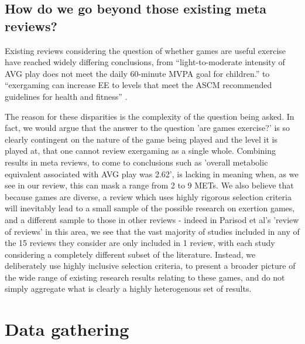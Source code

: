 

\subsection{How do we go beyond those existing meta reviews?}

Existing reviews considering the question of whether games are useful exercise have reached widely differing conclusions, from \enquote{light-to-moderate intensity of AVG play does not meet the daily 60-minute MVPA goal for children.\cite{Peng2013UsingResearch}} to \enquote{exergaming can increase EE to levels that meet the ASCM recommended guidelines for health and fitness} \cite{Sween2014TheReview}. 

The reason for these disparities is the complexity of the question being asked. In fact, we would argue that the answer to the question 'are games exercise?' is so clearly contingent on the nature of the game being played and the level it is played at, that one cannot review exergaming as a single whole. Combining results in meta reviews, to come to conclusions such as 'overall metabolic equivalent associated with AVG play was 2.62'\cite{Dutta2015EffectsReview}, is lacking in meaning when, as we see in our review, this can mask a range from 2 to 9 METs. We also believe that because games are diverse, a review which uses highly rigorous selection criteria will inevitably lead to a small sample of the possible research on exertion games, and a different sample to those in other reviews - indeed in Parisod et al's 'review of reviews' in this area\cite{Parisod2014PromotingReviews}, we see that the vast majority of studies included in any of the 15 reviews they consider are only included in 1 review, with each study considering a completely different subset of the literature. Instead, we deliberately use highly inclusive selection criteria, to present a broader picture of the wide range of existing research results relating to these games, and do not simply aggregate what is clearly a highly heterogenous set of results. 

\section{Data gathering}

